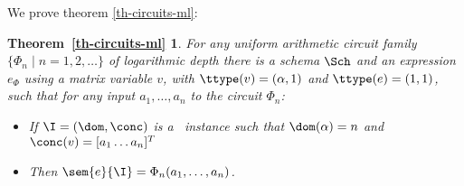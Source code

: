 \newtheorem*{CIRCUITTOML}{Theorem~\ref{th-circuits-ml}}

We prove theorem \ref{th-circuits-ml}:
\begin{CIRCUITTOML}
  For any uniform arithmetic circuit family $\{\Phi_n\mid n=1,2,\ldots\}$ of logarithmic depth there is a \langfor schema $\Sch$ and an expression $e_\Phi$ using a matrix variable $v$, with $\ttype(v)=(\alpha,1)$ and $\ttype(e) = (1,1)$, such that for any input $a_1,\ldots ,a_n$ to the circuit $\Phi_n$:
  \begin{itemize}
  \item If $\I = (\dom,\conc)$ is a \lang\ instance such that $\dom(\alpha) = n$ and $\conc(v) = [a_1 \ldots a_n]^T$
  \item Then $\sem{e}{\I} = \Phi_n(a_1,\ldots ,a_n)$.
  \end{itemize}
\end{CIRCUITTOML}

